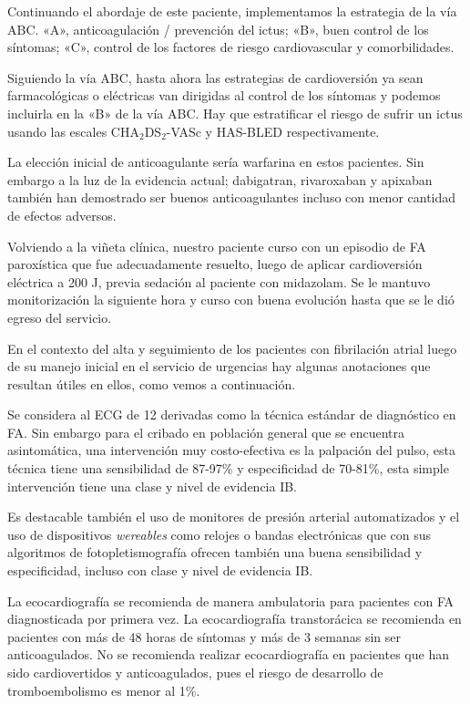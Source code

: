 \documentclass[a4paper]{article}
\let\cite=\supercite
\begin{document}
\begin{multicols}{3}
Continuando el abordaje de este paciente, implementamos la estrategia de la vía
ABC\cite{lip_abc_2017}. «A», anticoagulación / prevención del ictus; «B», buen
control de los síntomas; «C», control de los factores de riesgo cardiovascular
y comorbilidades.

Siguiendo la vía ABC, hasta ahora las estrategias de cardioversión ya sean
farmacológicas o eléctricas van dirigidas al control de los síntomas y podemos
incluirla en la «B» de la vía ABC. Hay que estratificar el riesgo de sufrir un
ictus usando las escales CHA$_{\text{2}}$DS$_{\text{2}}$-VASc
y HAS-BLED respectivamente.

La elección inicial de anticoagulante sería warfarina en estos pacientes. Sin
embargo a la luz de la evidencia actual; dabigatran, rivaroxaban y
apixaban\cite{ApWaFA} también han demostrado ser buenos anticoagulantes
incluso con menor cantidad de efectos adversos.

Volviendo a la viñeta clínica, nuestro paciente curso con un episodio de FA
paroxística que fue adecuadamente resuelto, luego de aplicar cardioversión
eléctrica a 200 J, previa sedación al paciente con midazolam. Se le mantuvo
monitorización la siguiente hora y curso con buena evolución hasta que se le
dió egreso del servicio.

En el contexto del alta y seguimiento de los pacientes con fibrilación atrial
luego de su manejo inicial en el servicio de urgencias hay algunas anotaciones
que resultan útiles en ellos, como vemos a continuación.

Se considera al ECG de 12 derivadas como la técnica estándar de diagnóstico en
FA\cite{mairesse2017}. Sin embargo para el cribado en población general que
se encuentra asintomática, una intervención muy costo-efectiva es la palpación
del pulso, esta técnica tiene una sensibilidad de 87-97\% y especificidad de
70-81\%, esta simple intervención tiene una clase y nivel de evidencia IB.

Es destacable también el uso de monitores de presión arterial automatizados y el
uso de dispositivos \emph{wereables} como relojes o bandas electrónicas que
con sus algoritmos de fotopletismografía ofrecen también una buena
sensibilidad y especificidad, incluso con clase y nivel de evidencia
IB\cite{guiaesc_2021}.

La ecocardiografía se recomienda de manera ambulatoria para pacientes con FA
diagnosticada por primera vez. La ecocardiografía transtorácica se recomienda
en pacientes con más de 48 horas de síntomas y más de 3 semanas sin ser
anticoagulados\cite{ecoamb19}. No se recomienda realizar ecocardiografía en
pacientes que han sido cardiovertidos y anticoagulados, pues el riesgo de
desarrollo de tromboembolismo es menor al 1\%\cite{eco13}.

\end{multicols}

\closearticle

\begin{multicols}{3}

\printbibliography[heading=none]

\end{multicols}
\end{document}
